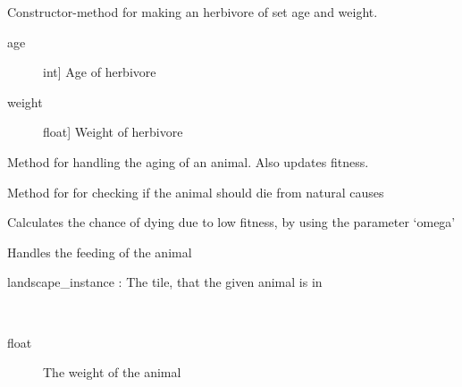 \documentclass[a4paper,10pt,english]{sphinxmanual}
\begin{document}
\begin{fulllineitems}
\label{\detokenize{animals:biosim.animals.Herbivore}}
Constructor-method for making an herbivore of set age and weight.
\begin{description}
\item[{age}] \leavevmode{[}int{]}
Age of herbivore

\item[{weight}] \leavevmode{[}float{]}
Weight of herbivore

\end{description}

\begin{fulllineitems}
\label{\detokenize{animals:biosim.animals.Herbivore.aging}}
Method for handling the aging of an animal. Also updates fitness.

\end{fulllineitems}


\begin{fulllineitems}
\label{\detokenize{animals:biosim.animals.Herbivore.death}}
Method for for checking if the animal should die from natural causes

Calculates the chance of dying due to low fitness, by using the
parameter `omega'

\end{fulllineitems}


\begin{fulllineitems}
\label{\detokenize{animals:biosim.animals.Herbivore.feeding}}
Handles the feeding of  the animal

landscape\_instance : The tile, that the given animal is in

\end{fulllineitems}


\begin{fulllineitems}
\label{\detokenize{animals:biosim.animals.Herbivore.get_weight}}~\begin{description}
\item[{float}] \leavevmode
The weight of the animal


\end{description}
\end{fulllineitems}
\end{fulllineitems}
\end{document}
